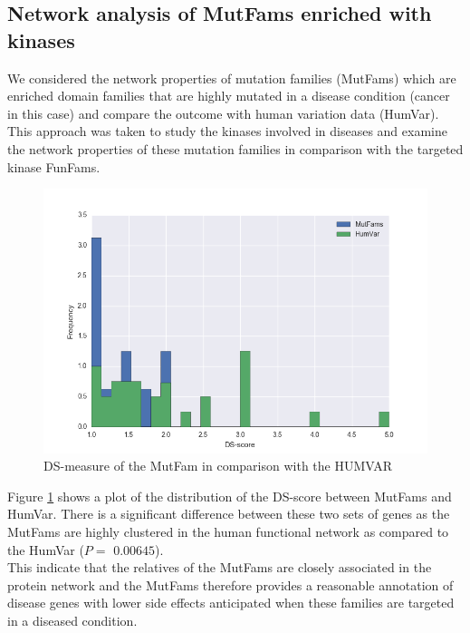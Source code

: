 \documentclass[a4paper, 11pt]{article}
\begin{document}
\subsection*{Network analysis of MutFams enriched with kinases}
We considered the network properties of mutation families (MutFams) which are enriched domain families that are highly mutated in a disease condition (cancer in this case) and compare the outcome with human variation data (HumVar). This approach was taken to study the kinases involved in diseases and examine the network properties of these mutation families in comparison with the targeted kinase FunFams.
\begin{figure}[H]
	\includegraphics[width=\linewidth]{figures/mutvar.png}
	\centering
	\caption{DS-measure of the MutFam in comparison with the HUMVAR}
	\label{mutvar}
\end{figure}
Figure \ref{mutvar} shows a plot of the distribution of the DS-score between MutFams and HumVar. There is a significant difference between these two sets of genes as the MutFams are highly clustered in the human functional network as compared to the HumVar ($P=$ $0.00645$). \\
This indicate that the relatives of the MutFams are closely associated in the protein network and the MutFams therefore provides a reasonable annotation of disease genes with lower side effects anticipated when these families are targeted in a diseased condition.
\end{document}
